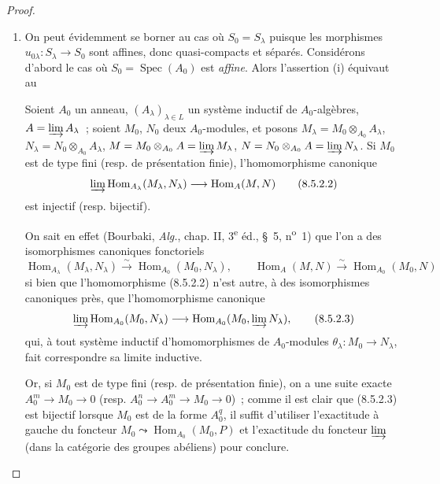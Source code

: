 \begin{proof}
\begin{enumerate}[label=(\roman*)]
  \item On peut évidemment se borner au cas où $S_0=S_\lambda$ puisque les
  morphismes $u_{0\lambda}:S_\lambda\to S_0$ sont affines, donc quasi-compacts
  et séparés. Considérons d'abord le cas où
  $S_0=\operatorname{Spec}(A_0)$ est \emph{affine}. Alors l'assertion (i)
  équivaut au

  \begin{lemma}[8.5.2.1]
  \label{IV.8.5.2.1-fr}
  Soient $A_0$ un anneau, $(A_\lambda)_{\lambda\in L}$ un système inductif de
  $A_0$-algèbres, $A=\varinjlim A_\lambda$~; soient $M_0$, $N_0$ deux
  $A_0$-modules, et posons
  $M_\lambda=M_0\otimes_{A_0}A_\lambda$,
  $N_\lambda=N_0\otimes_{A_0}A_\lambda$,
  $M=M_0\otimes_{A_0}A=\varinjlim M_\lambda$,
  $N=N_0\otimes_{A_0}A=\varinjlim N_\lambda$. Si $M_0$ est de type fini
  (\textup{resp.} de présentation finie), l'homomorphisme canonique
  \begin{equation}
    \varinjlim\operatorname{Hom}_{A_\lambda}(M_\lambda,N_\lambda)
    \longrightarrow\operatorname{Hom}_A(M,N)
    \tag{8.5.2.2}\label{IV.8.5.2.2-fr}
  \end{equation}
  est injectif (\textup{resp.} bijectif).
  \end{lemma}

  On sait en effet (Bourbaki, \emph{Alg.}, chap. II, 3\textsuperscript{e} éd.,
  \S~5, n\textsuperscript{o}~1) que l'on a des isomorphismes canoniques
  fonctoriels
  \[
    \operatorname{Hom}_{A_\lambda}(M_\lambda,N_\lambda)
    \xrightarrow{\sim}\operatorname{Hom}_{A_0}(M_0,N_\lambda),
    \qquad
    \operatorname{Hom}_A(M,N)
    \xrightarrow{\sim}\operatorname{Hom}_{A_0}(M_0,N)
  \]
  si bien que l'homomorphisme (8.5.2.2) n'est autre, à des isomorphismes
  canoniques près, que l'homomorphisme canonique
  \begin{equation}
    \varinjlim\operatorname{Hom}_{A_0}(M_0,N_\lambda)
    \longrightarrow
    \operatorname{Hom}_{A_0}(M_0,\varinjlim N_\lambda),
    \tag{8.5.2.3}\label{IV.8.5.2.3-fr}
  \end{equation}
  qui, à tout système inductif d'homomorphismes de $A_0$-modules
  $\theta_\lambda:M_0\to N_\lambda$, fait correspondre sa limite inductive.

  Or, si $M_0$ est de type fini (resp. de présentation finie), on a une suite
  exacte $A_0^m\to M_0\to0$ (resp. $A_0^n\to A_0^m\to M_0\to0$)~; comme il est
  clair que (8.5.2.3) est bijectif lorsque $M_0$ est de la forme $A_0^q$, il
  suffit d'utiliser l'exactitude à gauche du foncteur
  $M_0\leadsto\operatorname{Hom}_{A_0}(M_0,P)$ et l'exactitude du foncteur
  $\varinjlim$ (dans la catégorie des groupes abéliens) pour conclure.


\end{enumerate}
\end{proof}
